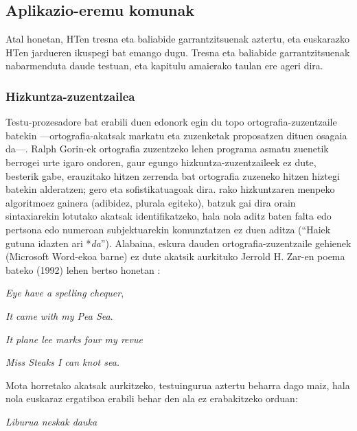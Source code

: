 \begin{multicols}{2}
\subsection{Aplikazio-eremu komunak} 
Atal honetan, HTen tresna eta baliabide garrantzitsuenak aztertu, eta euskarazko HTen jardueren ikuspegi bat emango dugu. Tresna eta baliabide garrantzitsuenak nabarmenduta daude testuan, eta kapitulu amaierako taulan ere ageri dira.

\subsubsection{Hizkuntza-zuzentzailea}
   Testu-prozesadore bat erabili duen edonork egin du topo ortografia-zuzentzaile batekin —ortografia-akatsak markatu eta zuzenketak proposatzen dituen osagaia da—. Ralph Gorin-ek ortografia zuzentzeko lehen programa asmatu zuenetik berrogei urte igaro ondoren, gaur egungo hizkuntza-zuzentzaileek ez dute, besterik gabe, erauzitako hitzen zerrenda bat ortografia zuzeneko hitzen hiztegi batekin alderatzen; gero eta sofistikatuagoak dira. rako hizkuntzaren menpeko algoritmoez gainera (adibidez, plurala egiteko), batzuk gai dira orain sintaxiarekin lotutako akatsak identifikatzeko, hala nola aditz baten falta edo pertsona edo numeroan subjektuarekin komunztatzen ez duen aditza (“Haiek gutuna idazten ari *\textit{da}”). Alabaina, eskura dauden ortografia-zuzentzaile gehienek (Microsoft Word-ekoa barne) ez dute akatsik aurkituko Jerrold H. Zar-en poema bateko (1992) lehen bertso honetan \cite{zar1}: 

\hspace{10pt}\textit{Eye have a spelling chequer},

\hspace{10pt}\textit{It came with my Pea Sea}.

\hspace{10pt}\textit{It plane lee marks four my revue}

\hspace{10pt}\textit{Miss Steaks I can knot sea.}

Mota horretako akatsak aurkitzeko, testuingurua aztertu beharra dago maiz, hala nola euskaraz ergatiboa erabili behar den ala ez erabakitzeko orduan:

\hspace{10pt}\textit{Liburua neskak dauka }
 

\end{multicols}
